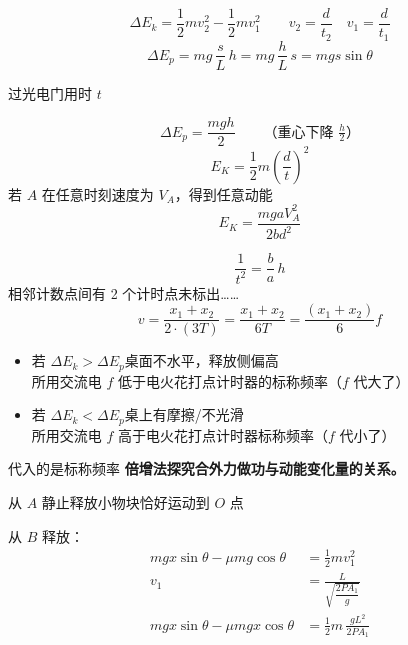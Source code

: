 \[ \Delta E_k=\frac12mv_2^2-\frac12mv_1^2\qquad v_2=\frac{d}{t_2}\quad v_1=\frac{d}{t_1} \]
\[ \Delta E_p=mg\,\frac{s}{L}\,h=mg\,\frac{h}{L}\,s=mgs\sin\theta \]

过光电门用时 $t$

\[ \Delta E_p=\frac{mgh}{2}\qquad\text{（重心下降 }\tfrac{h}{2}\text{）} \]
\[ E_K=\frac12m\left(\frac{d}{t}\right)^2 \]
若 $A$ 在任意时刻速度为 $V_A$，得到任意动能
\[ E_K=\frac{mgaV_A^2}{2bd^2} \]


\[ \frac{1}{t^2}=\frac{b}{a}\,h \]
相邻计数点间有 2 个计时点未标出\ldots\ldots
\[ v=\frac{x_1+x_2}{2\cdot(3T)}=\frac{x_1+x_2}{6T}=\frac{(x_1+x_2)}{6}f \]

\begin{itemize}
\item 若 $\Delta E_k>\Delta E_p$\quad 桌面不水平，释放侧偏高 \\
所用交流电 $f$ 低于电火花打点计时器的标称频率（$f$ 代大了） %
\item 若 $\Delta E_k<\Delta E_p$\quad 桌上有摩擦/不光滑 \\
所用交流电 $f$ 高于电火花打点计时器标称频率（$f$ 代小了）
\end{itemize}

代入的是标称频率
\textbf{倍增法探究合外力做功与动能变化量的关系。}


从 $A$ 静止释放小物块恰好运动到 $O$ 点

从 $B$ 释放：
\begin{align*}
mgx\sin\theta-\mu mg\cos\theta&=\frac12mv_1^2\\
v_1&=\frac{L}{\sqrt{\dfrac{2PA_1}{g}}}\\
mgx\sin\theta-\mu mgx\cos\theta&=\frac12m\,\frac{gL^2}{2PA_1}
\end{align*}

